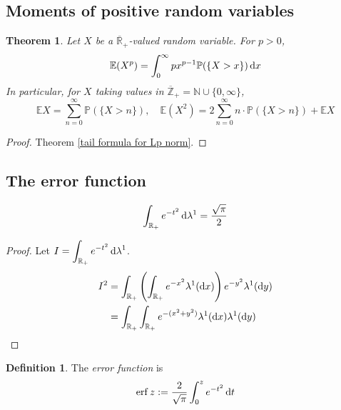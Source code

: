 \documentclass[11pt, a4paper, openany]{book}
\newtheorem{thm}{Theorem}\newtheorem{lem}{Lemma}\newtheorem{crl}{Corollary}
\theoremstyle{definition}
\newtheorem{define}{Definition}\newtheorem{exam}{Example}\newtheorem{remark}{Remark}
\newcommand{\er}{\overline{\mathbb{R}}}
\begin{document}
\subsection{Moments of positive random variables}
    \begin{thm}
        Let $X$ be a $\er_+$-valued random variable. For $p>0$,
        \[
            \mathbb{E}(X^p)=\int_0^\infty px^{p-1}\mathbb{P}(\{X>x\})\odif x
        \]
        In particular, for $X$ taking values in $\overline{\mathbb{Z}}_+=\mathbb{N}\cup\{0,\infty\}$,
        \[
            \mathbb{E}X=\sum_{n=0}^\infty \mathbb{P}(\{X>n\}),\quad \mathbb{E}(X^2)=2\sum_{n=0}^\infty n\cdot \mathbb{P}(\{X>n\})+\mathbb{E}X
        \]
    \end{thm}
    \begin{proof}
        Theorem \ref{tail formula for Lp norm}.
    \end{proof}
\subsection{The error function}
    \[\int_{\mathbb{R}_+} e^{-t^2}\odif \lambda^1=\frac{\sqrt{\pi}}{2}\]
    \begin{proof}
        Let $I=\displaystyle \int_{\mathbb{R}_+} e^{-t^2}\odif \lambda^1$.
        \begin{align*}
            I^2&=\int_{\mathbb{R}_+} \left(\int_{\mathbb{R}_+} e^{-x^2}\lambda^1(\odif x)\right) e^{-y^2}\lambda^1(\odif y)\\
            &=\int_{\mathbb{R}_+} \int_{\mathbb{R}_+} e^{-(x^2+y^2)}\lambda^1(\odif x)\lambda^1(\odif y)
        \end{align*}
    \end{proof}
    \begin{define}
        The \textit{error function} is
        \[
            \operatorname{erf} z:=\frac{2}{\sqrt{\pi}}\int_0^z e^{-t^2}\odif t
        \]
    \end{define}
\end{document}

